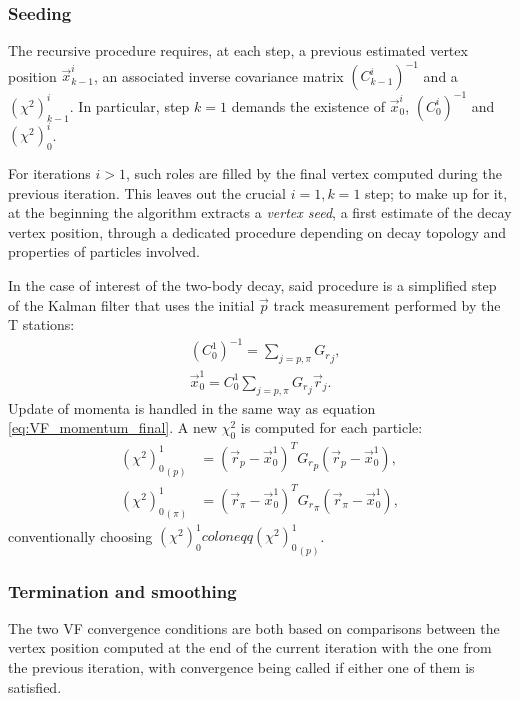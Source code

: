 \subsubsection{Seeding}
\label{sec:3:seeding}

The recursive procedure requires, at each step, a previous estimated vertex position $\vec{x}_{k-1}^i$, an associated inverse covariance matrix ${(C_{k-1}^i)}^{-1}$ and a ${(\chi^2)}_{k-1}^i$. In particular, step $k=1$ demands the existence of $\vec{x}_0^i$, ${(C_{0}^i)}^{-1}$ and ${(\chi^2)}_{0}^i$.

For iterations $i>1$, such roles are filled by the final vertex computed during the previous iteration.
This leaves out the crucial $i=1,k=1$ step;
to make up for it, at the beginning the algorithm extracts a \textit{vertex seed}, a first estimate of the decay vertex position, through a dedicated procedure depending on decay topology and properties of particles involved.

In the case of interest of the \lambdadecay two-body decay, said procedure is a simplified step of the Kalman filter that uses the initial $\vec{p}$ track measurement performed by the T stations:
\begin{subequations}
\begin{align}
	&{(C_{0}^{1})}^{-1} = \sum_{j=p,\pi} {G_r}_j, \\
	&\vec{x}_0^1 = C_0^1 \sum_{j=p,\pi} {G_r}_j \vec{r}_j.
\end{align}
\end{subequations}
Update of momenta is handled in the same way as equation \eqref{eq:VF_momentum_final}.
A new $\chi^2_0$ is computed for each particle:
\begin{subequations}
\begin{align}
	{{(\chi^2)}_0^1}_{(p)} &= 
	{\left(\vec{r}_{p} - \vec{x}_0^1\right)}^T  {G_r}_p \left(\vec{r}_{p} - \vec{x}_0^1 \right), \\
	{{(\chi^2)}_0^1}_{(\pi)} &= 
	{\left(\vec{r}_{\pi} - \vec{x}_0^1\right)}^T  {G_r}_\pi \left(\vec{r}_{\pi} - \vec{x}_0^1 \right),
\end{align}
\end{subequations}
conventionally choosing ${(\chi^2)}_0^1 coloneqq {{(\chi^2)}_0^1}_{(p)}$.

\subsubsection{Termination and smoothing}
The two VF convergence conditions are both based on comparisons between the vertex position computed at the end of the current iteration with the one from the previous iteration, with convergence being called if either one of them is satisfied.


